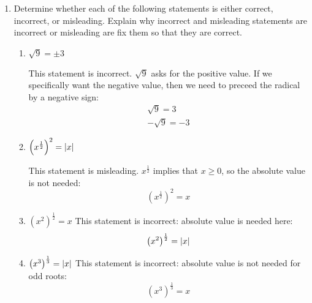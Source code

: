 \documentclass[letterpaper,12pt,fleqn]{article}
\begin{document}
\begin{enumerate}
\item Determine whether each of the following statements is either correct, incorrect, or misleading.  Explain why
  incorrect and misleading statements are incorrect or misleading are fix them so that they are correct.
  \begin{enumerate}
  \item \(\sqrt{9}=\pm3\)

    This statement is incorrect.  \(\sqrt{9}\) asks for the positive value.  If we specifically want the negative
    value, then we need to preceed the radical by a negative sign:
    \begin{gather*}
      \sqrt{9}=3 \\
      -\sqrt{9}=-3
    \end{gather*}
  \item \(\left(x^{\frac{1}{2}}\right)^2=\lvert x\rvert\)

    This statement is misleading.  \(x^{\frac{1}{2}}\) implies that \(x\ge0\), so the absolute value is not needed:
    \[\left(x^{\frac{1}{2}}\right)^2=x\]
  \item \(\left(x^2\right)^{\frac{1}{2}}=x\)
    This statement is incorrect: absolute value is needed here:
    \[\left(x^2\right)^{\frac{1}{2}}=\lvert x\rvert\]
  \item \(\left(x^3\right)^{\frac{1}{3}}=\lvert x\rvert\)
    This statement is incorrect: absolute value is not needed for odd roots:
    \[\left(x^3\right)^{\frac{1}{3}}=x\]
  \end{enumerate}

\end{enumerate}
\end{document}
